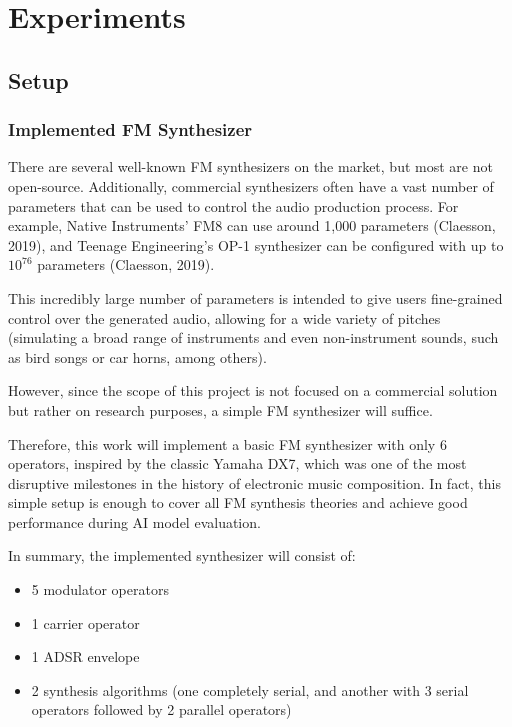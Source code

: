 \documentclass[sigconf,natbib=false]{acmart}
\begin{document}
\section{Experiments}

\subsection{Setup}

\subsubsection{Implemented FM Synthesizer}

There are several well-known FM synthesizers on the market, but most are not open-source. Additionally, commercial synthesizers often have a vast number of parameters that can be used to control the audio production process. For example, Native Instruments' FM8 can use around 1,000 parameters (Claesson, 2019), and Teenage Engineering’s OP-1 synthesizer can be configured with up to $10^{76}$ parameters (Claesson, 2019).

This incredibly large number of parameters is intended to give users fine-grained control over the generated audio, allowing for a wide variety of pitches (simulating a broad range of instruments and even non-instrument sounds, such as bird songs or car horns, among others).

However, since the scope of this project is not focused on a commercial solution but rather on research purposes, a simple FM synthesizer will suffice.

Therefore, this work will implement a basic FM synthesizer with only 6 operators, inspired by the classic Yamaha DX7, which was one of the most disruptive milestones in the history of electronic music composition. In fact, this simple setup is enough to cover all FM synthesis theories and achieve good performance during AI model evaluation.

In summary, the implemented synthesizer will consist of:

\begin{itemize}
\item 5 modulator operators
\item 1 carrier operator
\item 1 ADSR envelope
\item 2 synthesis algorithms (one completely serial, and another with 3 serial operators followed by 2 parallel operators)
\end{itemize}
\end{document}
